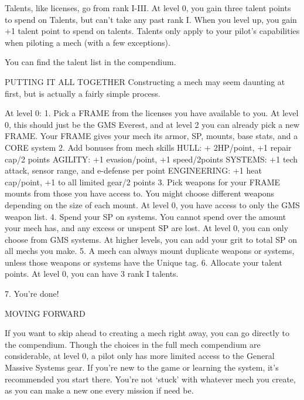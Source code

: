 Talents, like licenses, go from rank I-III. At level 0, you gain three talent points to spend on  
Talents, but can’t take any past rank I. When you level up, you gain +1 talent point to spend on  
talents. Talents only apply to your pilot’s capabilities when piloting a mech (with a few  
exceptions).
 

You can find the talent list in the compendium.
 

                                   PUTTING IT ALL TOGETHER  
Constructing a mech may seem daunting at first, but is actually a fairly simple process.  

At level 0:  
     1.  Pick a FRAME from the licenses you have available to you. At level 0, this should just be  
         the GMS Everest, and at level 2 you can already pick a new FRAME. Your FRAME gives  
         your mech its armor, SP, mounts, base stats, and a CORE system  
    2.   Add bonuses from mech skills  
                 HULL: + 2HP/point, +1 repair cap/2 points  
                 AGILITY: +1 evasion/point, +1 speed/2points  
                 SYSTEMS: +1 tech attack, sensor range, and e-defense per point  
                 ENGINEERING: +1 heat cap/point, +1 to all limited gear/2 points  
    3.   Pick weapons for your FRAME mounts from those you have access to. You might choose  
         different weapons depending on the size of each mount. At level 0, you have access to  
         only the GMS weapon list.  
    4.   Spend your SP on systems. You cannot spend over the amount your mech has, and any  
         excess or unspent SP are lost. At level 0, you can only choose from GMS systems. At  
         higher levels, you can add your grit to total SP on all mechs you make.  
    5.   A mech can always mount duplicate weapons or systems, unless those weapons or  
         systems have the Unique tag.  
    6.   Allocate your talent points. At level 0, you can have 3 rank I talents.
 
    7.   You’re done!
 

                                                                                                                


                                             MOVING FORWARD  

If you want to skip ahead to creating a mech right away, you can go directly to the compendium.  
Though the choices in the full mech compendium are considerable, at level 0, a pilot only has  
more limited access to the General Massive Systems gear. If you’re new to the game or learning  
the system, it’s recommended you start there. You’re not ‘stuck’ with whatever mech you create,  
as you can make a new one every mission if need be.  

